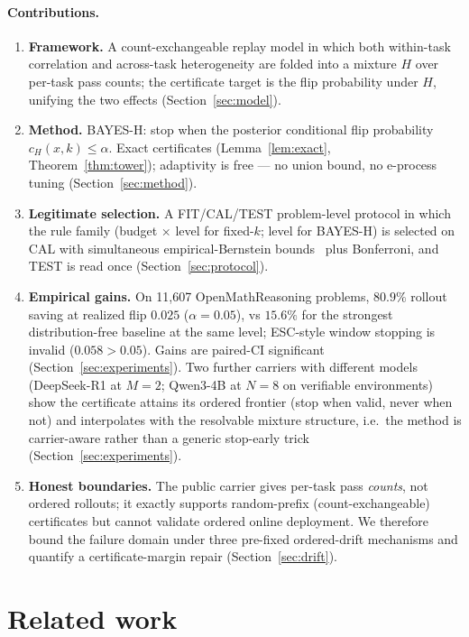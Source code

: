 \documentclass{article}
\theoremstyle{definition}
\theoremstyle{remark}
\begin{document}
\paragraph{Contributions.}
\begin{enumerate}[leftmargin=1.6em,itemsep=1pt]
\item \textbf{Framework.} A count-exchangeable replay model in which both
within-task correlation and across-task heterogeneity are folded into a
mixture $H$ over per-task pass counts; the certificate target is the flip
probability under $H$, unifying the two effects (Section~\ref{sec:model}).
\item \textbf{Method.} BAYES-H: stop when the posterior conditional flip
probability $c_H(x,k)\le\alpha$. Exact certificates (Lemma~\ref{lem:exact}, Theorem~\ref{thm:tower}); adaptivity is free --- no union
bound, no e-process tuning (Section~\ref{sec:method}).
\item \textbf{Legitimate selection.} A FIT/CAL/TEST problem-level protocol in
which the rule family (budget $\times$ level for fixed-$k$; level for BAYES-H)
is selected on CAL with simultaneous empirical-Bernstein
bounds~\citep{maurer2009eb} plus Bonferroni, and TEST is read once
(Section~\ref{sec:protocol}).
\item \textbf{Empirical gains.} On 11{,}607 OpenMathReasoning problems,
$80.9\%$ rollout saving at realized flip $0.025$ ($\alpha=0.05$), vs $15.6\%$
for the strongest distribution-free baseline at the same level; ESC-style
window stopping is invalid ($0.058>0.05$). Gains are paired-CI significant
(Section~\ref{sec:experiments}). Two further carriers with different models
(DeepSeek-R1 at $M=2$; Qwen3-4B at $N=8$ on verifiable environments) show the
certificate attains its ordered frontier (stop when valid, never when not)
and interpolates with the resolvable mixture structure, i.e.\ the method is
carrier-aware rather than a generic stop-early trick
(Section~\ref{sec:experiments}).
\item \textbf{Honest boundaries.} The public carrier gives per-task pass
\emph{counts}, not ordered rollouts; it exactly supports random-prefix
(count-exchangeable) certificates but cannot validate ordered online
deployment. We therefore bound the failure domain under three pre-fixed
ordered-drift mechanisms and quantify a certificate-margin repair
(Section~\ref{sec:drift}).
\end{enumerate}

\section{Related work}
\label{sec:related}
\end{document}
